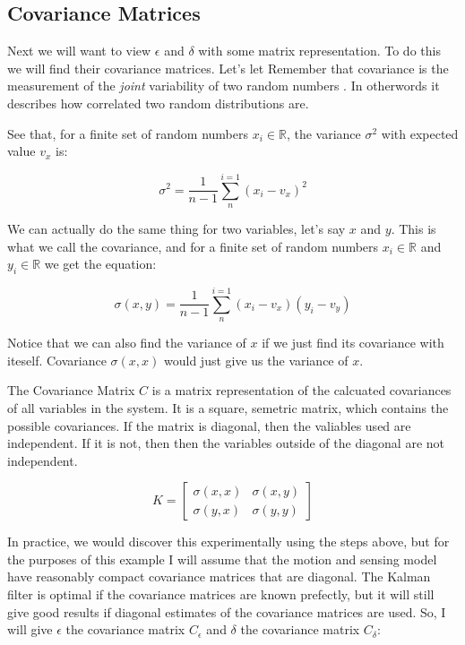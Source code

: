 \documentclass[11pt]{article}
\begin{document}
\subsection{Covariance Matrices}



  Next we will want to view $\epsilon$ and $\delta$ with some matrix representation.
To do this we will find their covariance matrices. Let's let Remember that covariance
is the measurement of the \textit{joint} variability of two random numbers \cite{feller1}. In otherwords
it describes how correlated two random distributions are.

See that, for a finite set of random numbers $x_i \in \mathbb{R}$, the variance $\sigma^2$ with expected value $v_x$ is:

\[
\sigma^2 = \frac{1}{n-1} \sum_{n}^{i=1} (x_i - v_x)^2
\]

We can actually do the same thing for two variables, let's say $x$ and $y$. This is
what we call the covariance, and for a finite set of random numbers $x_i \in \mathbb{R}$
and $y_i \in \mathbb{R}$ we get the equation:

\[
\sigma(x,y) = \frac{1}{n-1} \sum_{n}^{i=1} (x_i - v_x)(y_i - v_y)
\]

Notice that we can also find the variance of $x$ if we just find its covariance with
iteself. Covariance $\sigma(x,x)$ would just give us the variance of $x$.

The Covariance Matrix $C$ is a matrix representation of the calcuated covariances of
all variables in the system. It is a square, semetric matrix, which contains the possible covariances.
If the matrix is diagonal, then the valiables used are independent. If it is not, then
then the variables outside of the diagonal are not independent.

\[
K =
\begin{bmatrix}
\sigma(x,x) & \sigma(x,y) \\
\sigma(y,x) & \sigma(y,y)
\end{bmatrix}
\]

In practice, we would discover this experimentally using the steps above, but for
the purposes of this example I will assume that the motion and sensing model have
reasonably compact covariance matrices that are diagonal. The Kalman filter is
optimal if the covariance matrices are known prefectly, but it will still give
good results if diagonal estimates of the covariance matrices are used. So, I
will give $\epsilon$ the covariance matrix $C_{\epsilon}$ and $\delta$ the
covariance matrix $C_{\delta}$:
\end{document}
